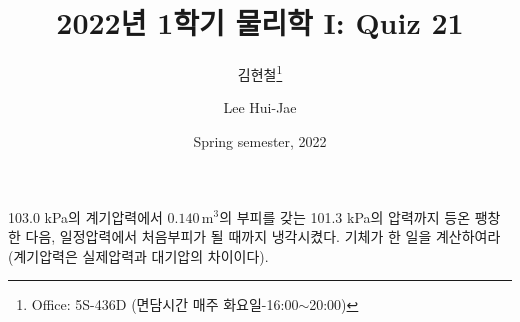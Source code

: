 \documentclass[floatfix,nofootinbib,superscriptaddress,fleqn]{revtex4}
\begin{document}
\title{\Large 2022년 1학기 물리학 I: Quiz 21}
\author{김현철\footnote{Office: 5S-436D (면담시간 매주
    화요일-16:00$\sim$20:00)}} 
\author{Lee Hui-Jae} 
\date{Spring semester, 2022}


\vspace{1.cm}

\maketitle

\vspace{1cm}
103.0 kPa의 계기압력에서
$0.140\,\mathrm{m}^3$의 부피를 갖는 101.3 kPa의 압력까지 등온 팽창한
다음, 일정압력에서 처음부피가 될 때까지 냉각시켰다. 기체가 한 일을
계산하여라(계기압력은 실제압력과 대기압의 차이이다). 
 \vspace{1cm}
 
\end{document}
